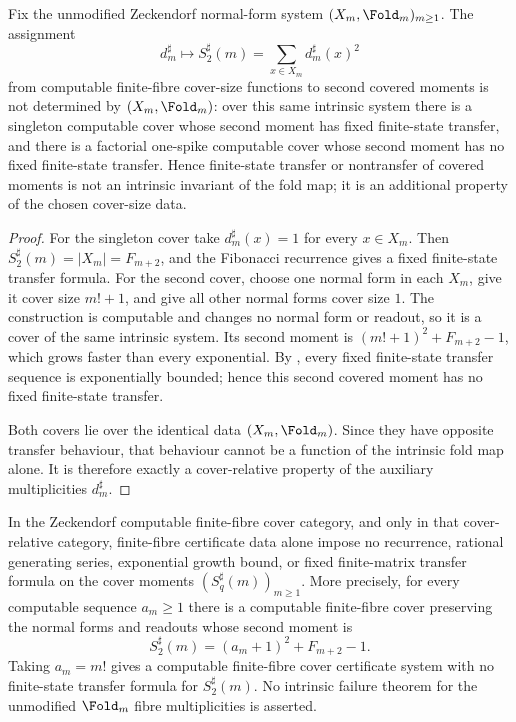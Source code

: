 \begin{proposition}
\label{prop:cover-category-invariance-finite-state-obstruction}
\label{thm:cover-relative-transfer-is-not-intrinsic}
Fix the unmodified Zeckendorf normal-form system \((X_m,\Fold_m)_{m\ge1}\).  The
assignment
\[
  d_m^\sharp\longmapsto S_2^\sharp(m)=\sum_{x\in X_m}d_m^\sharp(x)^2
\]
from computable finite-fibre cover-size functions to second covered moments is
not determined by \((X_m,\Fold_m)\): over this same intrinsic system there is a
singleton computable cover whose second moment has fixed finite-state transfer,
and there is a factorial one-spike computable cover whose second moment has no
fixed finite-state transfer.  Hence finite-state transfer or nontransfer of
covered moments is not an intrinsic invariant of the fold map; it is an
additional property of the chosen cover-size data.
\end{proposition}

\begin{proof}
For the singleton cover take \(d_m^\sharp(x)=1\) for every \(x\in X_m\).  Then
\(S_2^\sharp(m)=|X_m|=F_{m+2}\), and the Fibonacci recurrence gives a fixed
finite-state transfer formula.  For the second cover, choose one normal form in
each \(X_m\), give it cover size \(m!+1\), and give all other normal forms cover
size \(1\).  The construction is computable and changes no normal form or
readout, so it is a cover of the same intrinsic system.  Its second moment is
\((m!+1)^2+F_{m+2}-1\), which grows faster than every exponential.  By
, every fixed finite-state transfer
sequence is exponentially bounded; hence this second covered moment has no fixed
finite-state transfer.

Both covers lie over the identical data \((X_m,\Fold_m)\).  Since they have
opposite transfer behaviour, that behaviour cannot be a function of the
intrinsic fold map alone.  It is therefore exactly a cover-relative property of
the auxiliary multiplicities \(d_m^\sharp\).
\end{proof}
\begin{theorem}
\label{thm:L2-finite-fiber-no-transfer-content}
\label{thm:cover-relative-finite-fibre-no-transfer}
In the Zeckendorf computable finite-fibre cover category, and only in that
cover-relative category, finite-fibre certificate data alone impose no
recurrence, rational generating series, exponential growth bound, or fixed
finite-matrix transfer formula on the cover moments \((S_q^\sharp(m))_{m\ge1}\).
More precisely, for every computable sequence \(a_m\ge1\) there is a computable
finite-fibre cover preserving the normal forms and readouts whose second moment is
\[
  S_2^\sharp(m)=(a_m+1)^2+F_{m+2}-1 .
\]
Taking \(a_m=m!\) gives a computable finite-fibre cover certificate system with
no finite-state transfer formula for \(S_2^\sharp(m)\).  No intrinsic failure
theorem for the unmodified \(\Fold_m\) fibre multiplicities is asserted.
\end{theorem}

